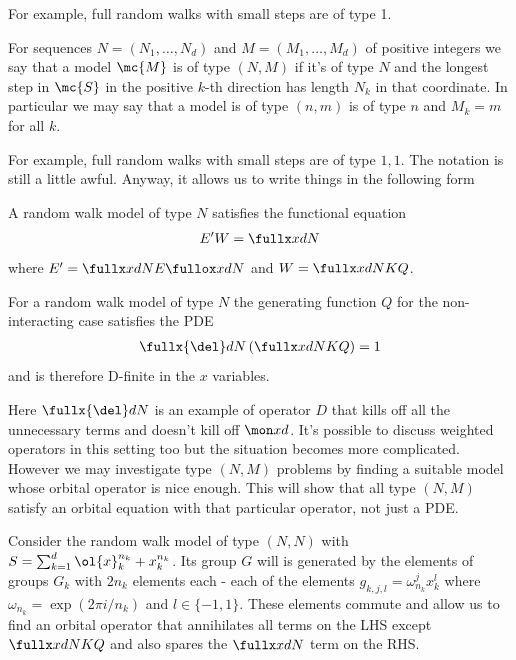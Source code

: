 For example, full random walks with small steps are of type 1.
\begin{definition}For sequences $N = (N_1,\ldots, N_d)$ and $M = (M_1,\ldots, M_d)$ of positive integers we say that a model $\mc{M}$ is of type $(N,M)$ if it's of type $N$ and the longest step in $\mc{S}$ in the positive $k$-th direction has length $N_k$ in that coordinate. In particular we may say that a model is of type $(n,m)$ is of type $n$ and $M_k = m$ for all $k$.
\end{definition}
For example, full random walks with small steps are of type $1,1$. The notation is still a little awful. Anyway, it allows us to write things in the following form
\begin{theorem} A random walk model of type $N$ satisfies the functional equation
\begin{align}
	E'W = \fullx xdN
\end{align}
where $E' = \fullx xdN E \fullox xdN$ and $W  = \fullx xdN KQ$.
\end{theorem}

\begin{corollary} For a random walk model of type $N$ the generating function $Q$ for the non-interacting case satisfies the PDE
\begin{align}
	\fullx{\del}dN\left(\fullx xdN KQ\right) = 1
\end{align}
and is therefore D-finite in the $x$ variables.
\end{corollary}
Here $\fullx{\del}dN$ is an example of operator $D$ that kills off all the unnecessary terms and doesn't kill off $\mon xd$. It's possible to discuss weighted operators in this setting too but the situation becomes more complicated. However we may investigate type $(N,M)$ problems by finding a suitable model whose orbital operator is nice enough. This will show that all type $(N,M)$ satisfy an orbital equation with that particular operator, not just a PDE. 

\begin{example} Consider the random walk model of type $(N,N)$ with $S = \sum_{k=1}^d \ol{x}_k^{n_k} + x_k^{n_k}$. Its group $G$ will is generated by the elements of groups $G_k$ with $2n_k$ elements each - each of the elements $g_{k,j,l} = \omega_{n_k}^jx_k^l$ where $\omega_{n_k} = \exp(2\pi i/n_k)$ and $l\in\{-1,1\}$. These elements commute and allow us to find an orbital operator that annihilates all terms on the LHS except  $\fullx xdN KQ$ and also spares the $\fullx xdN$ term on the RHS.
\end{example}

